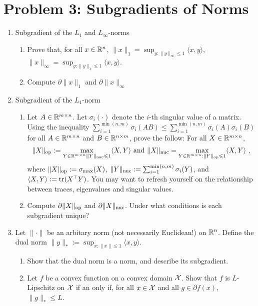 \documentclass[12pt]{article}
\begin{document}
\section*{Problem 3: Subgradients of Norms}
\begin{enumerate}
\item
Subgradient of the $L_1$ and $L_{\infty}$-norms
\begin{enumerate}
\item
Prove that, for all $x \in \mathbb{R}^n$, $\|x\|_1 = \sup_{y: \|y\|_{\infty} \le 1}\langle x, y \rangle$, $\|x\|_{\infty} = \sup_{y:\|y\|_1 \le 1}\langle x, y \rangle$. 
\item
Compute $\partial \|x\|_1$ and $\partial \|x\|_{\infty}$
\end{enumerate}
\item 
Subgradient of the $L_1$-norm
\begin{enumerate}
\item
Let $A \in \mathbb{R}^{m \times n}$. Let $\sigma_i(\cdot)$ denote the $i$-th singular value of a matrix. Using the inequality $\sum_{i=1}^{\min(n,m)}\sigma_i(AB) \le \sum_{i=1}^{\min(n,m)} \sigma_i(A)\sigma_i(B)$ for all $A \in \mathbb{R}^{m \times n}$ and $B \in \mathbb{R}^{n \times m}$, prove the follow: For all $X \in \mathbb{R}^{m \times n}$, 
\begin{eqnarray}
\|X\|_{\mathrm{op}} :=  \max_{Y \in \mathbb{R}^{m \times n}  \|Y\|_{\mathrm{nuc}} \leqslant 1} \langle X, Y \rangle  \text{ and } \|X\|_{\mathrm{nuc}} =  \max_{Y \in \mathbb{R}^{m \times n} :\|Y\|_{\mathrm{op}} \leqslant 1} \langle X, Y \rangle ~,
\end{eqnarray}
where $\|X\|_{\mathrm{op}} := \sigma_{\max}(X)$, $ \|Y\|_{\mathrm{nuc}} := \sum_{i=1}^{\min(n,m)} \sigma_i(Y)$, and $\langle X, Y \rangle := \mathrm{tr}(X^\top Y)$. You may want to refresh yourself on the relationship between traces, eigenvalues and singular values. 
\item
Compute $\partial \|X\|_{\mathrm{op}}$ and $\partial \|X\|_{\mathrm{nuc}}$. Under what conditions is each subgradient unique?
\end{enumerate}
\item 
Let  $\|\cdot\|$ be an arbitary norm (not necessarily Euclidean!)
on $\mathbb{R}^n$. Define the dual norm $\|y\|_* := \sup_{x: \|x\| \le 1}\langle x,y \rangle$. 
\begin{enumerate}
\item
Show that the dual norm is a norm, and describe its subgradient.
\item
Let $f$ be a convex function on a convex domain ${\cal X}$. Show that $f$ is $L$-Lipschitz on ${\cal X}$ if an only if, for all $x \in {\cal X}$ and all $g \in \partial f(x)$, $\|g\|_{*} \le L$. 
\end{enumerate}
\end{enumerate}
\end{document}
